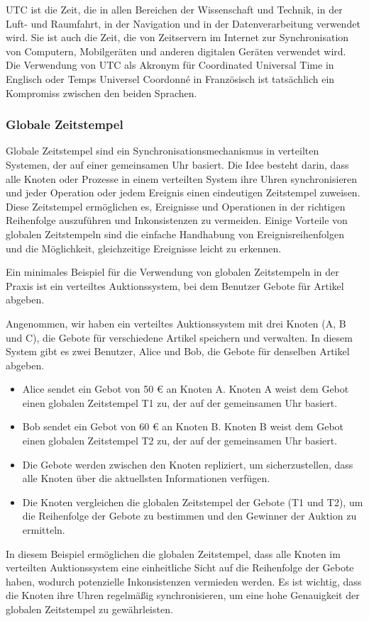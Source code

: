 UTC ist die Zeit, die in allen Bereichen der Wissenschaft und Technik, in der Luft- und Raumfahrt, in der Navigation und in der Datenverarbeitung verwendet wird. Sie ist auch die Zeit, die von Zeitservern im Internet zur Synchronisation von Computern, Mobilgeräten und anderen digitalen Geräten verwendet wird.
Die Verwendung von UTC als Akronym für Coordinated Universal Time in Englisch oder Temps Universel Coordonné in Französisch ist tatsächlich ein Kompromiss zwischen den beiden Sprachen.


\subsubsection{Globale Zeitstempel}
Globale Zeitstempel sind ein Synchronisationsmechanismus in verteilten Systemen, der auf einer gemeinsamen Uhr basiert. Die Idee besteht darin, dass alle Knoten oder Prozesse in einem verteilten System ihre Uhren synchronisieren und jeder Operation oder jedem Ereignis einen eindeutigen Zeitstempel zuweisen. Diese Zeitstempel ermöglichen es, Ereignisse und Operationen in der richtigen Reihenfolge auszuführen und Inkonsistenzen zu vermeiden. Einige Vorteile von globalen Zeitstempeln sind die einfache Handhabung von Ereignisreihenfolgen und die Möglichkeit, gleichzeitige Ereignisse leicht zu erkennen.

Ein minimales Beispiel für die Verwendung von globalen Zeitstempeln in der Praxis ist ein verteiltes Auktionssystem, bei dem Benutzer Gebote für Artikel abgeben.

Angenommen, wir haben ein verteiltes Auktionssystem mit drei Knoten (A, B und C), die Gebote für verschiedene Artikel speichern und verwalten. In diesem System gibt es zwei Benutzer, Alice und Bob, die Gebote für denselben Artikel abgeben.
\begin{itemize}
\item Alice sendet ein Gebot von 50 € an Knoten A. Knoten A weist dem Gebot einen globalen Zeitstempel T1 zu, der auf der gemeinsamen Uhr basiert.
\item Bob sendet ein Gebot von 60 € an Knoten B. Knoten B weist dem Gebot einen globalen Zeitstempel T2 zu, der auf der gemeinsamen Uhr basiert.
\item Die Gebote werden zwischen den Knoten repliziert, um sicherzustellen, dass alle Knoten über die aktuellsten Informationen verfügen.
\item Die Knoten vergleichen die globalen Zeitstempel der Gebote (T1 und T2), um die Reihenfolge der Gebote zu bestimmen und den Gewinner der Auktion zu ermitteln.
\end{itemize}
In diesem Beispiel ermöglichen die globalen Zeitstempel, dass alle Knoten im verteilten Auktionssystem eine einheitliche Sicht auf die Reihenfolge der Gebote haben, wodurch potenzielle Inkonsistenzen vermieden werden. Es ist wichtig, dass die Knoten ihre Uhren regelmäßig synchronisieren, um eine hohe Genauigkeit der globalen Zeitstempel zu gewährleisten.

